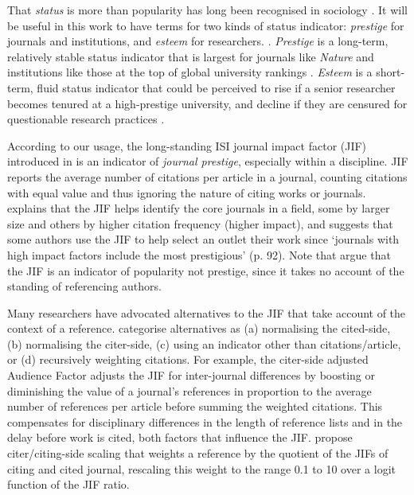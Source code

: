\documentclass[10pt]{article}
\begin{document}
That \textit{status} is more than popularity has long been recognised in sociology \citep[e.g.][]{katzNewStatusIndex1953, podolny05}. It will be useful in this work to have terms for two kinds of status indicator: \textit{prestige} for journals and institutions, and \textit{esteem} for researchers. \citep[This distinction reflects discussions in, e.g., []{davisPrinciplesStratification1945, goodeCelebrationHeroesPrestige2022}. \textit{Prestige} is a long-term, relatively stable status indicator that is largest for journals like \textit{Nature} \citep{baldwinMakingNatureHistory2019} and institutions like those at the top of global university rankings \citep{aguilloComparingUniversityRankings2010}. \textit{Esteem} is a short-term, fluid status indicator that could be perceived to rise if a senior researcher becomes tenured at a high-prestige university, and decline if they are censured for questionable research practices \citep{aronsonGainLossEsteem1965, hassanibesheliGainLossEsteem2017}. 
    

According to our usage, the long-standing ISI journal impact factor (JIF) introduced in \cite{garfield1955, garfieldHistoryMeaningJournal2006} is an indicator of \textit{journal prestige}, especially within a discipline. JIF reports the average number of citations per article in a journal, counting citations with equal value and thus ignoring the nature of citing works or journals. \cite{garfieldHistoryMeaningJournal2006} explains that the JIF helps identify the core journals in a field, some by larger size and others by higher citation frequency (higher impact), and suggests that some authors use the JIF to help select an outlet their work since `journals with high impact factors include the most prestigious' (p. 92). Note that \cite{bollenJournalStatus2006a} argue that the JIF is an indicator of popularity not prestige, since it takes no account of the standing of referencing authors. 
 
Many researchers have advocated alternatives to the JIF that take account of the context of a reference. \cite{waltmanRelationEigenfactorAudience2010} categorise alternatives as (a) normalising the cited-side, (b) normalising the citer-side, (c) using an indicator other than citations/article, or (d) recursively weighting citations. For example, the citer-side adjusted Audience Factor \citep{zitt2008} adjusts the JIF for inter-journal differences by boosting or diminishing the value of a journal's references in proportion to the average number of references per article before summing the weighted citations. This compensates for disciplinary differences in the length of reference lists and in the delay before work is cited, both factors that influence the JIF. \cite{habibzadehJournalWeightedImpact2008} propose citer/citing-side scaling that weights a reference by the quotient of the JIFs of citing and cited journal, rescaling this weight to the range 0.1 to 10 over a logit function of the JIF ratio. 
\end{document}
